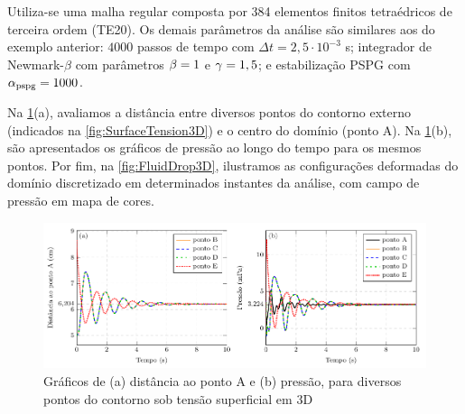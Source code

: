 \documentclass[Tese.tex]{subfiles}
\begin{document}
Utiliza-se uma malha regular composta por 384 elementos finitos tetraédricos de terceira ordem (TE20). Os demais parâmetros da análise são similares aos do exemplo anterior: $4000$ passos de tempo com $\Delta t = 2,5\cdot 10^{-3}$ s; integrador de Newmark-$\beta$ com parâmetros $\beta = 1$ e $\gamma = 1,5$; e estabilização PSPG com $\alpha_\text{pspg} = 1000$.

Na \cref{fig:FluidDrop3D-graphs}(a), avaliamos a distância entre diversos pontos do contorno externo (indicados na \cref{fig:SurfaceTension3D}) e o centro do domínio (ponto A). Na \cref{fig:FluidDrop3D-graphs}(b), são apresentados os gráficos de pressão ao longo do tempo para os mesmos pontos. Por fim, na \cref{fig:FluidDrop3D}, ilustramos as configurações deformadas do domínio discretizado em determinados instantes da análise, com campo de pressão em mapa de cores.

\begin{figure}[!htb]
	\centering
	\caption{Gráficos de (a) distância ao ponto A e (b) pressão, para diversos pontos do contorno sob tensão superficial em 3D}
	\label{fig:FluidDrop3D-graphs}
	\includegraphics[scale=1.0]{Figuras/SurfaceTension3D/SurfaceTension3D-graph.pdf}
\end{figure}
\end{document}
